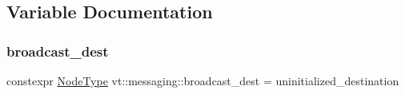 \subsection{Variable Documentation}
\mbox{\label{namespacevt_1_1messaging_a11d2b356f56486f2e60f0255cb6b05ff}} 
\subsubsection{\texorpdfstring{broadcast\+\_\+dest}{broadcast\_dest}}
{\footnotesize\ttfamily constexpr \hyperlink{namespacevt_a866da9d0efc19c0a1ce79e9e492f47e2}{Node\+Type} vt\+::messaging\+::broadcast\+\_\+dest = uninitialized\+\_\+destination}

